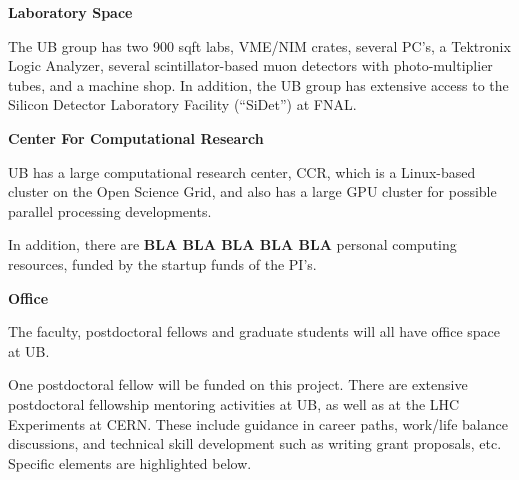 \documentclass[12pt]{article}
\begin{document}
\bigskip
{\bf Laboratory Space}

The UB group has two 900 sqft labs, VME/NIM crates,
several PC's, a Tektronix Logic Analyzer, several scintillator-based
muon detectors with photo-multiplier tubes, and a machine shop. 
In addition, the UB group has extensive access to the Silicon
Detector Laboratory Facility (``SiDet'') at FNAL. 

\bigskip
{\bf Center For Computational Research}

UB has a large computational research center, CCR, which is a
Linux-based cluster on the Open Science Grid, and also has a large GPU
cluster for possible parallel processing developments. 

In addition, there are {\bf BLA BLA BLA BLA BLA} personal computing
resources, funded by the startup funds of the PI's. 

\bigskip
{\bf Office}

The faculty, postdoctoral fellows and graduate students will all have
office space at UB. 


\newpage
{}
\renewcommand{\thepage} {D--\arabic{page}}

One postdoctoral fellow will be funded on this project. There are
extensive postdoctoral fellowship mentoring activities at UB, as well
as at the LHC 
Experiments at CERN. These include guidance in career paths,
work/life balance discussions, and technical skill development such as
writing grant proposals, etc. Specific elements are highlighted
below. 
\end{document}
